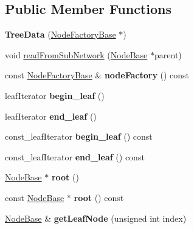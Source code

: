 \subsection*{Public Member Functions}
\begin{DoxyCompactItemize}
\item 
\mbox{\label{classTreeData_ac5c99083d4ad790701fca268306949ef}} 
{\bfseries Tree\+Data} (\mbox{\hyperlink{classNodeFactoryBase}{Node\+Factory\+Base}} $\ast$)
\item 
void \mbox{\hyperlink{classTreeData_af7aed3b2d2c5149331e36dd98767d9ef}{read\+From\+Sub\+Network}} (\mbox{\hyperlink{classNodeBase}{Node\+Base}} $\ast$parent)
\item 
\mbox{\label{classTreeData_ab44dfb076eaef070940c74daad665db8}} 
const \mbox{\hyperlink{classNodeFactoryBase}{Node\+Factory\+Base}} \& {\bfseries node\+Factory} () const
\item 
\mbox{\label{classTreeData_aeca2d83a81f4a25820e764dda195f115}} 
leaf\+Iterator {\bfseries begin\+\_\+leaf} ()
\item 
\mbox{\label{classTreeData_a0221ffda04a0b4f5779e7c9f6af64c4f}} 
leaf\+Iterator {\bfseries end\+\_\+leaf} ()
\item 
\mbox{\label{classTreeData_a0788058c71c3c6f281c05246e1321309}} 
const\+\_\+leaf\+Iterator {\bfseries begin\+\_\+leaf} () const
\item 
\mbox{\label{classTreeData_ae3faa2e9cb8eb3b1c231e3d851004c6d}} 
const\+\_\+leaf\+Iterator {\bfseries end\+\_\+leaf} () const
\item 
\mbox{\label{classTreeData_ac0f7988b2c51b61c0ab5c037e047920f}} 
\mbox{\hyperlink{classNodeBase}{Node\+Base}} $\ast$ {\bfseries root} ()
\item 
\mbox{\label{classTreeData_a7079f33946d9a17d587b1d497e2432ab}} 
const \mbox{\hyperlink{classNodeBase}{Node\+Base}} $\ast$ {\bfseries root} () const
\item 
\mbox{\label{classTreeData_abb6e801e3904f73b09bee2f02d137978}} 
\mbox{\hyperlink{classNodeBase}{Node\+Base}} \& {\bfseries get\+Leaf\+Node} (unsigned int index)

\end{DoxyCompactItemize}
